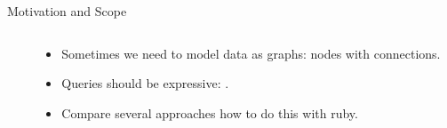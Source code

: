 \begin{frame}[fragile]{Motivation and Scope}
\begin{columns}
\begin{column}{0.6\textwidth}
    \end{column}

    \begin{column}{0.4\textwidth}
      \begin{itemize}
        \item Sometimes we need to model data as graphs: nodes with connections.
        \item Queries should be expressive: .
        \item Compare several approaches how to do this with ruby.
      \end{itemize}
    \end{column}
  \end{columns}

\end{frame}

